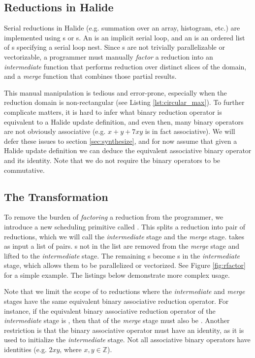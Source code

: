 \subsection{Reductions in Halide}

Serial reductions in Halide (e.g. summation over an array, histogram, etc.) are implemented using s or s. An  is an implicit serial loop, and an  is an ordered list of s specifying a serial loop nest. Since s are not trivially parallelizable or vectorizable, a programmer must manually \emph{factor} a reduction into an \emph{intermediate} function that performs reduction over distinct slices of the domain, and a \emph{merge} function that combines those partial results.

This manual manipulation is tedious and error-prone, especially when the reduction domain is non-rectangular (see Listing \ref{lst:circular_max}). To further complicate matters, it is hard to infer what binary reduction operator is equivalent to a Halide update definition, and even then, many binary operators are not obviously associative (e.g. $x + y + 7xy$ is in fact associative). We will defer these issues to section \ref{sec:synthesize}, and for now assume that given a Halide update definition we can deduce the equivalent associative binary operator and its identity. Note that we do not require the binary operators to be commutative.

\subsection{The  Transformation}

To remove the burden of \emph{factoring} a reduction from the programmer, we introduce a new scheduling primitive called . This splits a reduction into pair of reductions, which we will call the \emph{intermediate} stage and the \emph{merge} stage.  takes as input a list of  pairs. s not in the list are removed from the \emph{merge} stage and lifted to the \emph{intermediate} stage. The remaining s become s in the \emph{intermediate} stage, which allows them to be parallelized or vectorized. See Figure \ref{fig:rfactor} for a simple example. The listings below demonstrate more complex usage.

 Note that we limit the scope of  to reductions where the \emph{intermediate} and \emph{merge} stages have the same equivalent binary associative reduction operator. For instance, if the equivalent binary associative reduction operator of the \emph{intermediate} stage is , then that of the \emph{merge} stage must also be . Another restriction is that the binary associative operator must have an identity, as it is used to initialize the \emph{intermediate} stage. Not all associative binary operators have identities (e.g. $2xy$, where $x, y \in \mathds{Z}$).

